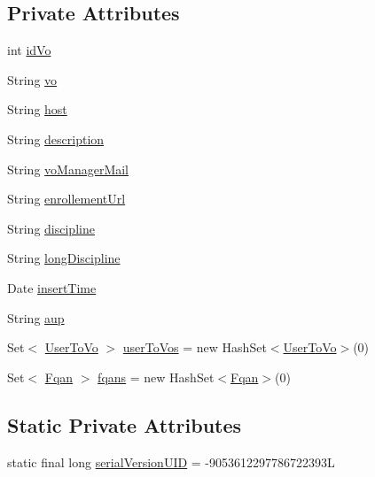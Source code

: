 \subsection*{Private Attributes}
\begin{DoxyCompactItemize}
\item 
int \hyperlink{classportal_1_1registration_1_1domain_1_1Vo_ad30081c762c1013c30f53f07a88aaf6c}{idVo}
\item 
String \hyperlink{classportal_1_1registration_1_1domain_1_1Vo_a1c5498821ecbdd3d80d5dce3f26a907e}{vo}
\item 
String \hyperlink{classportal_1_1registration_1_1domain_1_1Vo_a39734694dfee646e14aa1a49cb06e5a0}{host}
\item 
String \hyperlink{classportal_1_1registration_1_1domain_1_1Vo_ae59559dc7f4ebe9ba0fe8657774d6ddf}{description}
\item 
String \hyperlink{classportal_1_1registration_1_1domain_1_1Vo_a40f905eb8ab449d765fd1bcb7488a876}{voManagerMail}
\item 
String \hyperlink{classportal_1_1registration_1_1domain_1_1Vo_ad9cd8c77be188df99d145d515c7249c7}{enrollementUrl}
\item 
String \hyperlink{classportal_1_1registration_1_1domain_1_1Vo_ab5ce7543fdba244953f198d31d367723}{discipline}
\item 
String \hyperlink{classportal_1_1registration_1_1domain_1_1Vo_ace2d40b5322f647c70ba092e468edaec}{longDiscipline}
\item 
Date \hyperlink{classportal_1_1registration_1_1domain_1_1Vo_a151311e5b51385dffb6d6d207159ac65}{insertTime}
\item 
String \hyperlink{classportal_1_1registration_1_1domain_1_1Vo_af69ab6e7d6a8c9d628bea1a85e3c27d3}{aup}
\item 
Set$<$ \hyperlink{classportal_1_1registration_1_1domain_1_1UserToVo}{UserToVo} $>$ \hyperlink{classportal_1_1registration_1_1domain_1_1Vo_a643d30daf36de4c59c48ce381f5ca18d}{userToVos} = new HashSet$<$\hyperlink{classportal_1_1registration_1_1domain_1_1UserToVo}{UserToVo}$>$(0)
\item 
Set$<$ \hyperlink{classportal_1_1registration_1_1domain_1_1Fqan}{Fqan} $>$ \hyperlink{classportal_1_1registration_1_1domain_1_1Vo_ac9fbb476da6a7943923272ceaee88bf8}{fqans} = new HashSet$<$\hyperlink{classportal_1_1registration_1_1domain_1_1Fqan}{Fqan}$>$(0)
\end{DoxyCompactItemize}
\subsection*{Static Private Attributes}
\begin{DoxyCompactItemize}
\item 
static final long \hyperlink{classportal_1_1registration_1_1domain_1_1Vo_aa9365210570260c23bbc54f07154598c}{serialVersionUID} = -\/9053612297786722393L
\end{DoxyCompactItemize}


